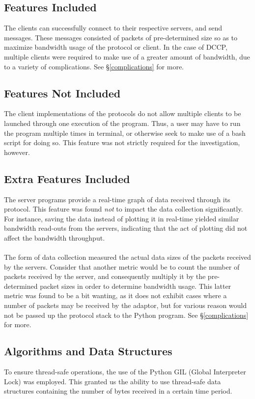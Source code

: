 \documentclass[10pt,a4paper]{article}
\begin{document}
\subsection{Features Included}
The clients can successfully connect to their respective servers, and send messages. These messages consisted of packets
of pre-determined size so as to maximize bandwidth usage of the protocol or client. In the case of DCCP, multiple clients were required
to make use of a greater amount of bandwidth, due to a variety of complications. See \S\ref{complications} for more. 

\subsection{Features Not Included}
The client implementations of the protocols do not allow multiple clients to be launched through one
execution of the program. Thus, a user may have to run the program multiple times in terminal, or otherwise
seek to make use of a bash script for doing so. This feature was not strictly required for the investigation, however.

\subsection{Extra Features Included}
The server programs provide a real-time graph of data received through its protocol. This feature was found \emph{not} to impact the
data collection significantly. For instance, saving the data instead of plotting it in real-time yielded similar bandwidth read-outs
from the servers, indicating that the act of plotting did not affect the bandwidth throughput. 
\paragraph{}
The form of data collection measured the actual data sizes of the packets received by the servers. Consider that another metric 
would be to count the number of packets received by the server, and consequently multiply it by the pre-determined packet sizes
in order to determine bandwidth usage. This latter metric was found to be a bit wanting, as it does not exhibit cases where a number
of packets may be received by the adaptor, but for various reason would not be passed up the protocol stack to the Python program. See
\S\ref{complications} for more. 

\subsection{Algorithms and Data Structures}
To ensure thread-safe operations, the use of the Python GIL (Global Interpreter Lock) was employed. This granted us
the ability to use thread-safe data structures containing the number of bytes received in a certain time period. 
\end{document}
